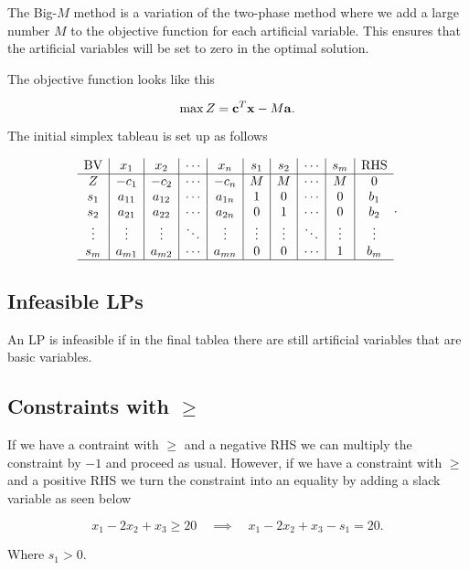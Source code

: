 \documentclass{report}
\begin{document}
The Big-$M$ method is a variation of the two-phase method where we add a large number $M$ to the objective function for each artificial variable. This ensures that the artificial variables will be set to zero in the optimal solution.

The objective function looks like this

\[
	\max Z = \vb{c}^T \vb{x} - M \vb{a}
	.\]

The initial simplex tableau is set up as follows

\[
	\begin{array}{c|c|c|c|c|c|c|c|c|c}
		\text{BV} & x_1    & x_2     & \cdots & x_n    & s_1    & s_2    & \cdots & s_m    & \text{RHS} \\
		\hline
		Z         & -c_1   & -c_2    & \cdots & -c_n   & M      & M      & \cdots & M      & 0          \\
		s_1       & a_{11} & a_{12}  & \cdots & a_{1n} & 1      & 0      & \cdots & 0      & b_1        \\
		s_2       & a_{21} & a_{22}  & \cdots & a_{2n} & 0      & 1      & \cdots & 0      & b_2        \\
		\vdots    & \vdots & \vdots  & \ddots & \vdots & \vdots & \vdots & \ddots & \vdots & \vdots     \\
		s_m       & a_{m1} & a _{m2} & \cdots & a_{mn} & 0      & 0      & \cdots & 1      & b_m        \\
		\hline
	\end{array}
	.\]

\subsection{Infeasible LPs}

An LP is infeasible if in the final tablea there are still artificial variables that are basic variables.

\subsection{Constraints with $\geq$}

If we have a contraint with $\geq$ and a negative RHS we can multiply the constraint by $-1$ and proceed as usual.
However, if we have a constraint with $\geq$ and a positive RHS we turn the constraint into an equality by adding a slack variable as seen below

\[
	x_1-2x_2+x_3\geq20\quad\implies\quad x_1-2x_2+x_3-s_1=20
	.\]

Where $s_1>0$. \\
\end{document}
